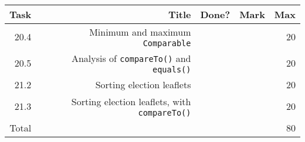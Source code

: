 \newcommand{\class}[1]{\texttt{#1}}
\newcommand{\interface}[1]{\texttt{#1}}
\newcommand{\method}[2]{\texttt{#2()}}
\newcommand{\methodnoclass}[1]{\texttt{#1()}}
\\ \\ \\ \noindent\parbox[l]{\textwidth}{
 \\ \\
\begin{tabular}{||r|r|r|r|r||} \hline \hline
Task  & Title                            & Done? & Mark & Max \\ \hline
20.4 & Minimum and maximum \interface{Comparable} & & & 20 \\ \hline
20.5 & Analysis of \methodnoclass{compareTo} and \methodnoclass{equals} & & & 20 \\ \hline
21.2 & Sorting election leaflets & & & 20 \\ \hline
21.3 & Sorting election leaflets, with \method{DeliveryHouseDetails}{compareTo} & & & 20 \\ \hline
\hline
Total &                                  &       &      & 80 \\ \hline
\hline
\end{tabular} \\ \\
}

